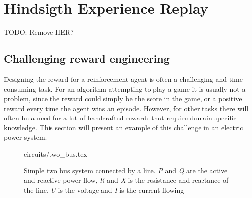 \documentclass[class=book, crop=false]{standalone}
\begin{document}
\section{Hindsigth Experience Replay}
TODO: Remove HER?
\subsection{Challenging reward engineering}\label{theory:challenging_reward_shaping}

Designing the reward for a reinforcement agent is often a challenging and time-consuming task. For an algorithm attempting to play a game it is usually not a problem, since the reward could simply be the score in the game, or a positive reward every time the agent wins an episode. However, for other tasks there will often be a need for a lot of handcrafted rewards that require domain-specific knowledge. This section will present an example of this challenge in an electric power system.

\begin{figure}[ht!]
    \center
    {circuits/two_bus.tex}
    \caption[size = 9]
    {Simple two bus system connected by a line. \textit{P} and \textit{Q} are the active and reactive power flow, \textit{R} and \textit{X} is the resistance and reactance of the line, \textit{U} is the voltage and \textit{I} is the current flowing}    \label{fig:theory:two_bus_reinforcement}
\end{figure}
\end{document}
